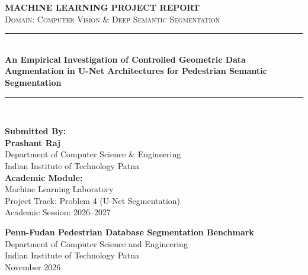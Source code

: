 \documentclass[10pt,a4paper]{article}
\begin{document}
\begin{titlepage}
    \centering
    \vspace*{0.2cm}
    
    {\large \textbf{MACHINE LEARNING PROJECT REPORT}}\\[0.2cm]
    {\normalsize \textsc{Domain: Computer Vision \& Deep Semantic Segmentation}}\\[1.0cm]
    
    \rule{\linewidth}{1.0pt}\\[0.3cm]
    {\Large \textbf{An Empirical Investigation of Controlled Geometric Data Augmentation in U-Net Architectures for Pedestrian Semantic Segmentation}}\\[0.1cm]
    \rule{\linewidth}{1.0pt}\\[1.0cm]
    
    \vspace{0.5cm}
    
    {\large \textbf{Submitted By:}}\\[0.15cm]
    {\large \textbf{Prashant Raj}}\\[0.1cm]
    {\normalsize Department of Computer Science \& Engineering}\\[0.1cm]
    {\normalsize Indian Institute of Technology Patna}\\[0.8cm]
    
    {\large \textbf{Academic Module:}}\\[0.15cm]
    {\normalsize Machine Learning Laboratory}\\[0.1cm]
    {\normalsize Project Track: Problem 4 (U-Net Segmentation)}\\[0.1cm]
    {\normalsize Academic Session: 2026--2027}\\[0.5cm]
    
    \vfill
    
    {\textbf{Penn-Fudan Pedestrian Database Segmentation Benchmark}}\\[0.1cm]
    {\normalsize Department of Computer Science and Engineering}\\[0.1cm]
    {\normalsize Indian Institute of Technology Patna}\\[0.4cm]
    {\small November 2026}
\end{titlepage}

\setcounter{page}{2}
\end{document}
